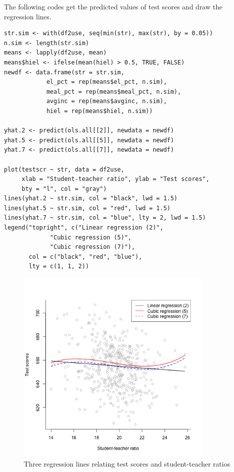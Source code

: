 \documentclass[11pt]{article}
\begin{document}
The following codes get the predicted values of test scores and draw
the regression lines.
\begin{verbatim}
str.sim <- with(df2use, seq(min(str), max(str), by = 0.05))
n.sim <- length(str.sim)
means <- lapply(df2use, mean)
means$hiel <- ifelse(mean(hiel) > 0.5, TRUE, FALSE)
newdf <- data.frame(str = str.sim,
		    el_pct = rep(means$el_pct, n.sim),
		    meal_pct = rep(means$meal_pct, n.sim),
		    avginc = rep(means$avginc, n.sim),
		    hiel = rep(means$hiel, n.sim))

yhat.2 <- predict(ols.all[[2]], newdata = newdf)
yhat.5 <- predict(ols.all[[5]], newdata = newdf)
yhat.7 <- predict(ols.all[[7]], newdata = newdf)

plot(testscr ~ str, data = df2use,
     xlab = "Student-teacher ratio", ylab = "Test scores",
     bty = "l", col = "gray")
lines(yhat.2 ~ str.sim, col = "black", lwd = 1.5)
lines(yhat.5 ~ str.sim, col = "red", lwd = 1.5)
lines(yhat.7 ~ str.sim, col = "blue", lty = 2, lwd = 1.5)
legend("topright", c("Linear regression (2)",
		     "Cubic regression (5)",
		     "Cubic regression (7)"),
       col = c("black", "red", "blue"),
       lty = c(1, 1, 2))
\end{verbatim}

\begin{figure}[htbp]
\centering
\includegraphics[width=0.85\textwidth]{./img/fig-8-10.png}
\caption{\label{fig:org9c90b99}
Three regression lines relating test scores and student-teacher ratios}
\end{figure}
\end{document}
